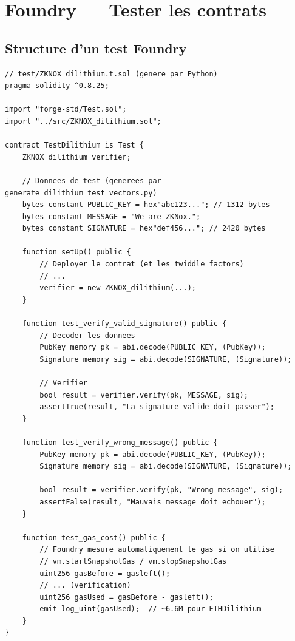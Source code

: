 \documentclass[12pt, a4paper]{article}
\begin{document}
\section{Foundry --- Tester les contrats}

\subsection{Structure d'un test Foundry}

\begin{lstlisting}[style=solidity]
// test/ZKNOX_dilithium.t.sol (genere par Python)
pragma solidity ^0.8.25;

import "forge-std/Test.sol";
import "../src/ZKNOX_dilithium.sol";

contract TestDilithium is Test {
    ZKNOX_dilithium verifier;

    // Donnees de test (generees par generate_dilithium_test_vectors.py)
    bytes constant PUBLIC_KEY = hex"abc123..."; // 1312 bytes
    bytes constant MESSAGE = "We are ZKNox.";
    bytes constant SIGNATURE = hex"def456..."; // 2420 bytes

    function setUp() public {
        // Deployer le contrat (et les twiddle factors)
        // ...
        verifier = new ZKNOX_dilithium(...);
    }

    function test_verify_valid_signature() public {
        // Decoder les donnees
        PubKey memory pk = abi.decode(PUBLIC_KEY, (PubKey));
        Signature memory sig = abi.decode(SIGNATURE, (Signature));

        // Verifier
        bool result = verifier.verify(pk, MESSAGE, sig);
        assertTrue(result, "La signature valide doit passer");
    }

    function test_verify_wrong_message() public {
        PubKey memory pk = abi.decode(PUBLIC_KEY, (PubKey));
        Signature memory sig = abi.decode(SIGNATURE, (Signature));

        bool result = verifier.verify(pk, "Wrong message", sig);
        assertFalse(result, "Mauvais message doit echouer");
    }

    function test_gas_cost() public {
        // Foundry mesure automatiquement le gas si on utilise
        // vm.startSnapshotGas / vm.stopSnapshotGas
        uint256 gasBefore = gasleft();
        // ... (verification)
        uint256 gasUsed = gasBefore - gasleft();
        emit log_uint(gasUsed);  // ~6.6M pour ETHDilithium
    }
}
\end{lstlisting}
\end{document}
